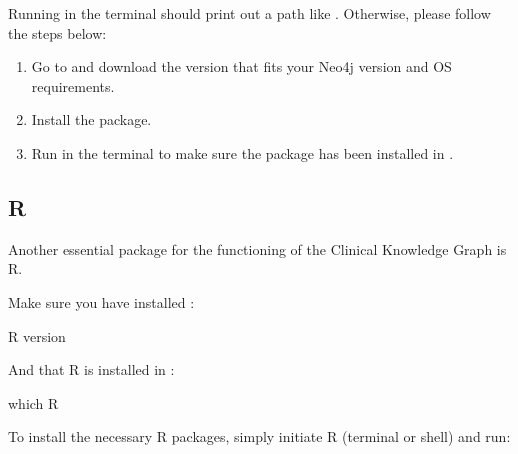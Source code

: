 \documentclass[letterpaper,10pt,english]{sphinxmanual}
\begin{document}
Running  in the terminal should print out a path like . Otherwise, please follow the steps below:
\begin{enumerate}
%
\item {} 
Go to  and download the version that fits your Neo4j version and OS requirements.

\item {} 
Install the package.

\item {} 
Run  in the terminal to make sure the  package has been installed in .

\end{enumerate}


\subsection{R}
\label{\detokenize{intro/getting-started-with-requirements:r}}
Another essential package for the functioning of the Clinical Knowledge Graph is R.

Make sure you have installed :

\begin{sphinxVerbatim}[commandchars=\\\{\}]
\PYGZdl{} R \PYGZhy{}\PYGZhy{}version
\end{sphinxVerbatim}

And that R is installed in :

\begin{sphinxVerbatim}[commandchars=\\\{\}]
\PYGZdl{} which R
\end{sphinxVerbatim}

To install the necessary R packages, simply initiate R (terminal or shell) and run:
\end{document}
